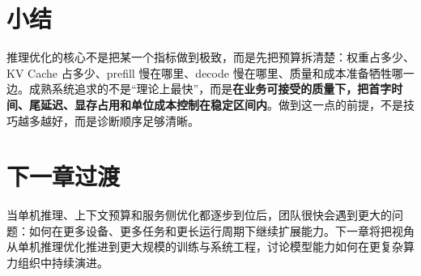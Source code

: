 \section{小结}
推理优化的核心不是把某一个指标做到极致，而是先把预算拆清楚：权重占多少、KV Cache 占多少、prefill 慢在哪里、decode 慢在哪里、质量和成本准备牺牲哪一边。成熟系统追求的不是“理论上最快”，而是\textbf{在业务可接受的质量下，把首字时间、尾延迟、显存占用和单位成本控制在稳定区间内}。做到这一点的前提，不是技巧越多越好，而是诊断顺序足够清晰。

\section{下一章过渡}
当单机推理、上下文预算和服务侧优化都逐步到位后，团队很快会遇到更大的问题：如何在更多设备、更多任务和更长运行周期下继续扩展能力。下一章将把视角从单机推理优化推进到更大规模的训练与系统工程，讨论模型能力如何在更复杂算力组织中持续演进。
